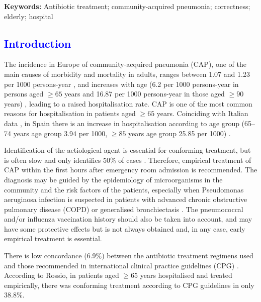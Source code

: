 \documentclass[11pt, a4paper]{article}
\begin{document}
{\bf Keywords:} Antibiotic treatment; community-acquired pneumonia; correctness; elderly; hospital

\begin{multicols}{2}
\section*{\textcolor{blue}{Introduction}}
The incidence in Europe of community-acquired pneumonia (CAP), one of the main causes of morbidity and mortality in adults, ranges between 1.07 and 1.23 per 1000 persons-year \cite{torres2013risk}, and increases with age (6.2 per 1000 persons-year in persons aged $\geq65$ years and 16.87 per 1000 persons-year in those aged $\geq90$ years) \cite{rivero2016incidence}, leading to a raised hospitalisation rate. CAP is one of the most common reasons for hospitalisation in patients aged $\geq65$ years. Coinciding with Italian data \cite{petrosillo2015treatment}, in Spain there is an increase in hospitalisation according to age group (65–74 years age group 3.94 per 1000, $\geq85$ years age group 25.85 per 1000) \cite{de2017trends}.

Identification of the aetiological agent is essential for conforming treatment, but is often slow and only identifies 50\% of cases \cite{mandell2007infectious}. Therefore, empirical treatment of CAP within the first hours after emergency room admission is recommended. The diagnosis may be guided by the epidemiology of microorganisms in the community and the risk factors of the patients, especially when Pseudomonas aeruginosa infection is suspected in patients with advanced chronic obstructive pulmonary disease (COPD) or generalised bronchiectasis \cite{menendez2010neumonia, gutierrez2005epidemiology}. The pneumococcal and/or influenza vaccination history should also be taken into account, and may have some protective effects \cite{cruzeta2013impact, tomczyk2014use, bennett2012use, centers2010updated, bonten2015polysaccharide, dominguez2010effectiveness} but is not always obtained and, in any case, early empirical treatment is essential.

There is low concordance (6.9\%) between the antibiotic treatment regimens used and those
recommended in international clinical practice guidelines (CPG) \cite{mandell2007infectious, lim2009bts, woodhead2011joint, robinson2014poor}. According to Rossio, in patients aged $\geq65$ years hospitalised and treated empirically, there was conforming treatment according to CPG guidelines \cite{rossio2015adherence} in only 38.8\%.


\end{multicols}
\end{document}
